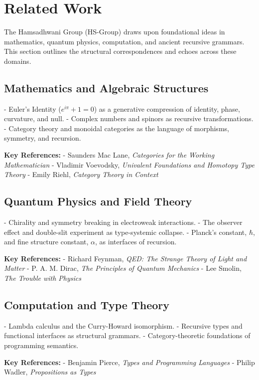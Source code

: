 
\section{Related Work}

The Hamsadhwani Group (HS-Group) draws upon foundational ideas in mathematics, quantum physics, computation, and ancient recursive grammars. This section outlines the structural correspondences and echoes across these domains.

\subsection{Mathematics and Algebraic Structures}

- Euler’s Identity ($e^{i\pi} + 1 = 0$) as a generative compression of identity, phase, curvature, and null.
- Complex numbers and spinors as recursive transformations.
- Category theory and monoidal categories as the language of morphisms, symmetry, and recursion.

\textbf{Key References:}
- Saunders Mac Lane, \textit{Categories for the Working Mathematician}  
- Vladimir Voevodsky, \textit{Univalent Foundations and Homotopy Type Theory}
- Emily Riehl, \textit{Category Theory in Context}

\subsection{Quantum Physics and Field Theory}

- Chirality and symmetry breaking in electroweak interactions.
- The observer effect and double-slit experiment as type-systemic collapse.
- Planck’s constant, $\hbar$, and fine structure constant, $\alpha$, as interfaces of recursion.

\textbf{Key References:}
- Richard Feynman, \textit{QED: The Strange Theory of Light and Matter}  
- P. A. M. Dirac, \textit{The Principles of Quantum Mechanics}  
- Lee Smolin, \textit{The Trouble with Physics}

\subsection{Computation and Type Theory}

- Lambda calculus and the Curry-Howard isomorphism.
- Recursive types and functional interfaces as structural grammars.
- Category-theoretic foundations of programming semantics.

\textbf{Key References:}
- Benjamin Pierce, \textit{Types and Programming Languages}  
- Philip Wadler, \textit{Propositions as Types}

